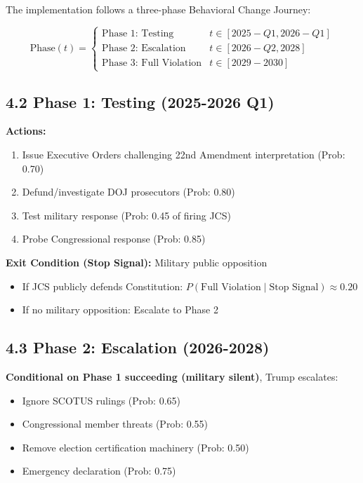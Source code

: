 The implementation follows a three-phase Behavioral Change Journey:

\begin{equation}
\text{Phase}(t) = \begin{cases}
\text{Phase 1: Testing} & t \in [2025-Q1, 2026-Q1] \\
\text{Phase 2: Escalation} & t \in [2026-Q2, 2028] \\
\text{Phase 3: Full Violation} & t \in [2029-2030]
\end{cases}
\end{equation}

\subsection{4.2 Phase 1: Testing (2025-2026 Q1)}

\textbf{Actions:}
\begin{enumerate}
\item Issue Executive Orders challenging 22nd Amendment interpretation (Prob: 0.70)
\item Defund/investigate DOJ prosecutors (Prob: 0.80)
\item Test military response (Prob: 0.45 of firing JCS)
\item Probe Congressional response (Prob: 0.85)
\end{enumerate}

\textbf{Exit Condition (Stop Signal):} Military public opposition
\begin{itemize}
\item If JCS publicly defends Constitution: $P(\text{Full Violation} \mid \text{Stop Signal}) \approx 0.20$
\item If no military opposition: Escalate to Phase 2
\end{itemize}

\subsection{4.3 Phase 2: Escalation (2026-2028)}

\textbf{Conditional on Phase 1 succeeding (military silent)}, Trump escalates:

\begin{itemize}
\item Ignore SCOTUS rulings (Prob: 0.65)
\item Congressional member threats (Prob: 0.55)
\item Remove election certification machinery (Prob: 0.50)
\item Emergency declaration (Prob: 0.75)
\end{itemize}

